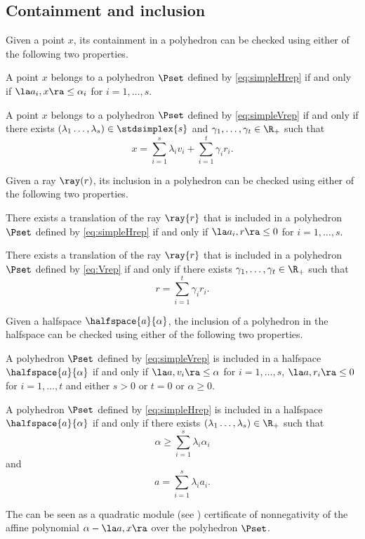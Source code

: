 \documentclass[11pt,twoside,a4paper,openright]{uclouvain-thesis}
\newcommand{\ineqnum}{s}
\begin{document}
\subsection{Containment and inclusion}

Given a point $x$, its containment in a polyhedron can be checked using either of the following two properties.
\begin{myprop}
  \label{prop:vinhrep}
  A point $x$ belongs to a polyhedron $\Pset$ defined by \eqref{eq:simpleHrep} if and only if
  $\la a_i, x \ra \le \alpha_i$ for $i = 1, \ldots, \ineqnum$.
\end{myprop}
\begin{myprop}
  \label{prop:vinvrep}
  A point $x$ belongs to a polyhedron $\Pset$ defined by \eqref{eq:simpleVrep} if and only if there exists $(\lambda_1 \ldots, \lambda_s) \in \stdsimplex{s}$ and
  $\gamma_1, \ldots, \gamma_t \in \R_+$ such that
  \[ x = \sum_{i=1}^s \lambda_i v_i + \sum_{i=1}^t \gamma_i r_i. \]
\end{myprop}

Given a ray $\ray(r)$, its inclusion in a polyhedron can be checked using either of the following two properties.
\begin{myprop}
  \label{prop:rinhrep}
  There exists a translation of the ray $\ray{r}$ that is included in a polyhedron $\Pset$ defined by \eqref{eq:simpleHrep} if and only if
  $\la a_i, r \ra \le 0$ for $i = 1, \ldots, \ineqnum$.
\end{myprop}
\begin{myprop}
  \label{prop:rinvrep}
  There exists a translation of the ray $\ray{r}$ that is included in a polyhedron $\Pset$ defined by \eqref{eq:Vrep} if and only if there exists
  $\gamma_1, \ldots, \gamma_t \in \R_+$ such that
  \[ r = \sum_{i=1}^t \gamma_i r_i. \]
\end{myprop}

Given a halfspace $\halfspace{a}{\alpha}$, the inclusion of a polyhedron in the halfspace can be checked using either of the following two properties.
\begin{myprop}
  \label{prop:hinvrep}
  A polyhedron $\Pset$ defined by \eqref{eq:simpleVrep} is included in a halfspace $\halfspace{a}{\alpha}$ if and only if
  $\la a, v_i \ra \le \alpha$ for $i = 1, \ldots, s$,
  $\la a, r_i \ra \le 0$ for $i = 1, \ldots, t$
  and either $s > 0$ or $t = 0$ or $\alpha \ge 0$.
\end{myprop}
\begin{myprop}
  \label{prop:hinhrep}
  A polyhedron $\Pset$ defined by \eqref{eq:simpleHrep} is included in a halfspace $\halfspace{a}{\alpha}$ if and only if there exists $(\lambda_1 \ldots, \lambda_\ineqnum) \in \R_+$ such that
  \[ \alpha \ge \sum_{i=1}^\ineqnum \lambda_i \alpha_i \]
  and
  \[ a = \sum_{i=1}^\ineqnum \lambda_i a_i. \]
\end{myprop}
The  can be seen as a quadratic module (see ) certificate of nonnegativity of
the affine polynomial $\alpha - \la a, x \ra$ over the polyhedron $\Pset$.
\end{document}

